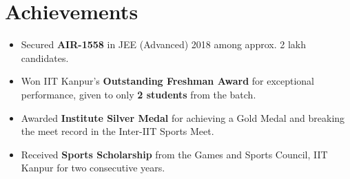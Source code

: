 \documentclass[10pt,a4paper]{article}
\newcommand{\resumeItem}[1]{\item[\textcolor{primary}{\textbullet}] #1}
\begin{document}
\section{Achievements}
\small
\begin{itemize}[leftmargin=1.05em, nosep, topsep=2pt, itemsep=2pt, parsep=0pt]
    \resumeItem{Secured \textbf{AIR-1558} in JEE (Advanced) 2018 among approx. 2 lakh candidates.}
    \resumeItem{Won IIT Kanpur's \textbf{Outstanding Freshman Award} for exceptional performance, given to only \textbf{2 students} from the batch.}
    \resumeItem{Awarded \textbf{Institute Silver Medal} for achieving a Gold Medal and breaking the meet record in the Inter-IIT Sports Meet.}
    \resumeItem{Received \textbf{Sports Scholarship} from the Games and Sports Council, IIT Kanpur for two consecutive years.}
\end{itemize}
\end{document}
